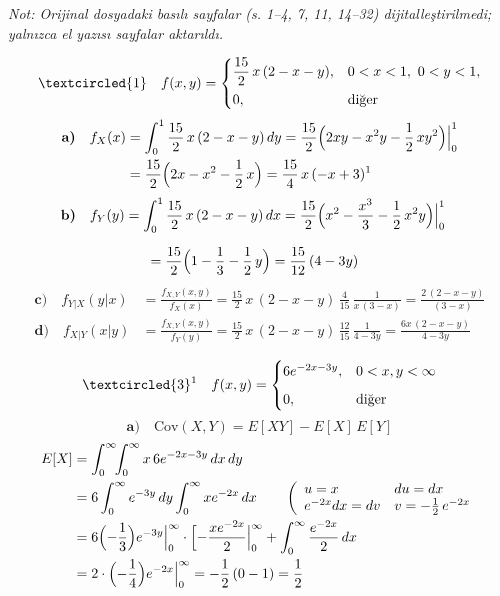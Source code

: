 \documentclass[11pt,a4paper]{article}
\begin{document}
\textit{Not: Orijinal dosyadaki basılı sayfalar (s. 1–4, 7, 11, 14–32) dijitalleştirilmedi; yalnızca el yazısı sayfalar aktarıldı.}

\[
\textcircled{1}\quad f(x,y)=\begin{cases}\dfrac{15}{2}\,x\,(2-x-y), & 0<x<1,\ 0<y<1,\\[2mm] 0, & \text{diğer}\end{cases}
\]
\begin{align*}
\textbf{a)}\quad f_X(x)&=\int_0^1 \frac{15}{2}\,x\,(2-x-y)\,dy=\frac{15}{2}\Bigl(2xy-x^2y-\frac12\,xy^2\Bigr)\Big|_0^1\\
&=\frac{15}{2}\Bigl(2x-x^2-\frac12\,x\Bigr)=\frac{15}{4}\,x\,(-x+3)\text{\footnotemark}
\end{align*}
\begin{align*}
\textbf{b)}\quad f_Y(y)&=\int_0^1 \frac{15}{2}\,x\,(2-x-y)\,dx=\frac{15}{2}\Bigl(x^2-\frac{x^3}{3}-\frac12\,x^2y\Bigr)\Big|_0^1
\end{align*}

\begin{align*}
&=\frac{15}{2}\Bigl(1-\frac13-\frac12\,y\Bigr)=\frac{15}{12}\,(4-3y)
\end{align*}
\begin{align*}
\textbf{c)}\quad f_{Y|X}(y|x)&=\frac{f_{X,Y}(x,y)}{f_X(x)}=\frac{15}{2}\,x\,(2-x-y)\,\frac{4}{15}\,\frac{1}{x\,(3-x)}=\frac{2\,(2-x-y)}{(3-x)}\\[5mm]
\textbf{d)}\quad f_{X|Y}(x|y)&=\frac{f_{X,Y}(x,y)}{f_Y(y)}=\frac{15}{2}\,x\,(2-x-y)\,\frac{12}{15}\,\frac{1}{4-3y}=\frac{6x\,(2-x-y)}{4-3y}
\end{align*}

\[
\textcircled{3}\text{\footnotemark}\quad f(x,y)=\begin{cases}6e^{-2x-3y}, & 0<x,y<\infty\\[2mm] 0, & \text{diğer}\end{cases}
\]
\[
\textbf{a)}\quad \mathrm{Cov}(X,Y)=E[XY]-E[X]\,E[Y]
\]
\begin{align*}
E[X]&=\int_0^\infty\!\!\int_0^\infty x\,6e^{-2x-3y}\,dx\,dy\\
&=6\int_0^\infty e^{-3y}\,dy\int_0^\infty xe^{-2x}\,dx\qquad
\left(\begin{array}{ll}u=x & du=dx\\ e^{-2x}dx=dv & v=-\frac12\,e^{-2x}\end{array}\right.\\
&=6\Bigl(-\frac13\Bigr)e^{-3y}\Big|_0^\infty\cdot\Bigl[-\frac{xe^{-2x}}{2}\Big|_0^\infty+\int_0^\infty\frac{e^{-2x}}{2}\,dx\\
&=2\cdot\Bigl(-\frac14\Bigr)e^{-2x}\Big|_0^\infty=-\frac12\,(0-1)=\frac12
\end{align*}
\end{document}
